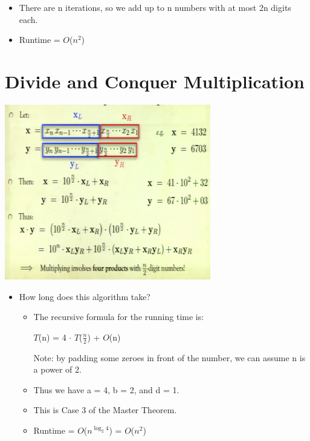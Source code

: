 \documentclass[12pt]{article}
\begin{document}
\begin{itemize}
\begin{itemize}
		\begin{itemize}
		\item There are n iterations, so we add up to n numbers with at most 2n digits each.
		\item Runtime = $O$($n^2$)
		\end{itemize}
	\end{itemize}
\end{itemize}

\section{Divide and Conquer Multiplication}
\renewcommand{\labelitemii}{$\circ$}
\renewcommand{\labelitemiii}{$\cdot$}
\renewcommand{\labelitemiii}{$\rightarrow$}
\includegraphics{lecture43}
\begin{itemize}
\item How long does this algorithm take?
	\begin{itemize}
	\item The recursive formula for the running time is:
	
	\hspace*{\fill} {\large $T$(n) = 4 $\cdot$ $T$($\frac{n}{2}$) + $O$(n) } \hspace*{\fill} 
	
	Note: by padding some zeroes in front of the number, we can assume n is a power of 2.
	\item Thus we have a = 4, b = 2, and d = 1.
	\item This is Case 3 of the Master Theorem.
	\item Runtime = $O$($n^{\log_2 4}$) = $O$($n^2$)
	\end{itemize}
\end{itemize}
\end{document}
